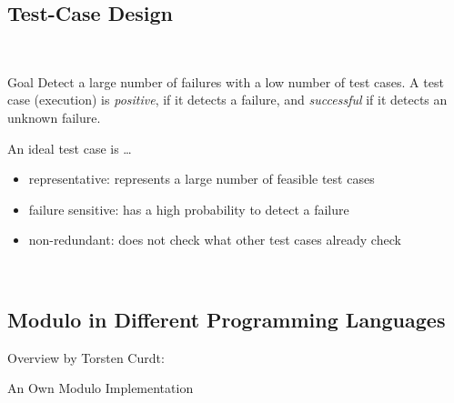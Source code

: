 \subsection{Test-Case Design}
\begin{frame}{\insertsubsection\ }
	\begin{fancycolumns}
		\begin{note}{Goal \mysource{\ludewiglichter}}
			Detect a large number of failures with a low number of test cases. A test case (execution) is \emph{positive}, if it detects a failure, and \emph{successful} if it detects an unknown failure.
		\end{note}
		\begin{definition}{An ideal test case is \ldots \mysource{\ludewiglichter}}
			\begin{itemize}
				\item representative: represents a large number of feasible test cases
				\item failure sensitive: has a high probability to detect a failure
				\item non-redundant: does not check what other test cases already check
			\end{itemize}
		\end{definition}
		\nextcolumn
		\\\vspace{-7mm}
		\hfill
	\end{fancycolumns}
\end{frame}

\subsection{Modulo in Different Programming Languages}
\begin{frame}{\insertsubsection}
	\begin{fancycolumns}[widths={55}]
		\begin{exampletight}{Overview by Torsten Curdt:}
			\centering\picDark[height=60mm]{testing/modulo-negative}
		\end{exampletight}
		\nextcolumn
		\begin{exampletight}{An Own Modulo Implementation}
			\centering{} %
		\end{exampletight}
	\end{fancycolumns}
\end{frame}

